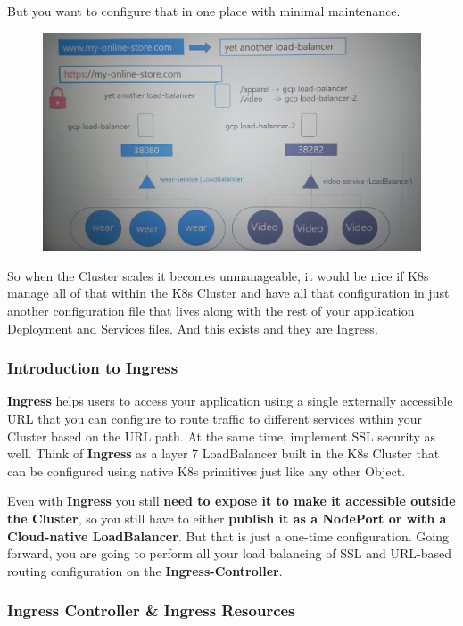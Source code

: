 \documentclass{article}
\begin{document}
But you want to configure that in one place with minimal maintenance.

\begin{figure}[H]
    \centering
    \includegraphics[width=\textwidth]{pictures/ingress7.png}
\end{figure}

So when the Cluster scales it becomes unmanageable, it would be nice if K8s manage all of that within the K8s Cluster and have all that configuration in just another configuration file that lives along with the rest  of your application Deployment and Services files. And this exists and they are Ingress.

\subsubsection{Introduction to Ingress}

\textbf{Ingress} helps users to access your application using a single externally accessible URL that you can configure to route traffic to different services within your Cluster based on the URL path. At the same time, implement SSL security as well. Think of \textbf{Ingress} as a layer 7 LoadBalancer built in the K8s Cluster that can be configured using native K8s primitives just like any other Object.

Even with \textbf{Ingress} you still \textbf{need to expose it to make it accessible outside the Cluster}, so you still have to either \textbf{publish it as a NodePort or with a Cloud-native LoadBalancer}. But that is just a one-time configuration. Going forward, you are going to perform all your load balancing of SSL and URL-based routing configuration on the \textbf{Ingress-Controller}.

\subsubsection{Ingress Controller \& Ingress Resources}
\end{document}
